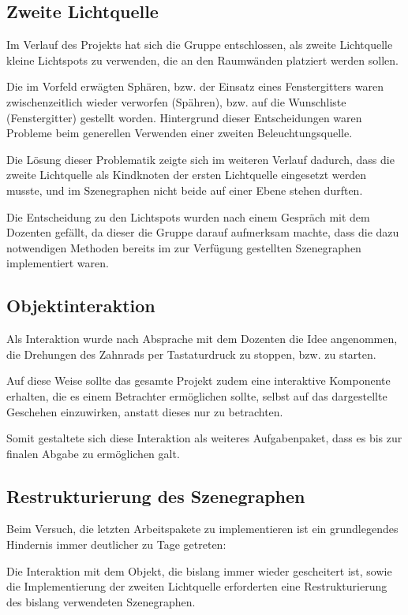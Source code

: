 \documentclass{article}
\begin{document}
\subsection{Zweite Lichtquelle}
Im Verlauf des Projekts hat sich die Gruppe entschlossen, als zweite 
Lichtquelle kleine Lichtspots zu verwenden, die an den Raumwänden platziert werden sollen. 

Die im Vorfeld erwägten Sphären, bzw. der Einsatz eines Fenstergitters waren zwischenzeitlich wieder verworfen (Spähren), bzw. auf die Wunschliste (Fenstergitter) gestellt worden. 
Hintergrund dieser Entscheidungen waren Probleme beim generellen Verwenden einer zweiten Beleuchtungsquelle. 

Die Lösung dieser Problematik zeigte sich im weiteren Verlauf dadurch, dass die zweite Lichtquelle als Kindknoten der ersten Lichtquelle eingesetzt werden musste, und im Szenegraphen nicht beide auf einer Ebene stehen durften. 

Die Entscheidung zu den Lichtspots wurden nach einem Gespräch mit dem Dozenten gefällt, da dieser die Gruppe darauf aufmerksam machte, dass die dazu notwendigen Methoden bereits im zur Verfügung gestellten Szenegraphen implementiert waren. 



\subsection{Objektinteraktion}
Als Interaktion wurde nach Absprache mit dem Dozenten die Idee angenommen, die Drehungen des Zahnrads per Tastaturdruck zu stoppen, bzw. zu starten. 

Auf diese Weise sollte das gesamte Projekt zudem eine interaktive Komponente erhalten, die es einem Betrachter ermöglichen sollte, selbst auf das dargestellte Geschehen einzuwirken, anstatt dieses nur zu betrachten. 

Somit gestaltete sich diese Interaktion als weiteres Aufgabenpaket, dass es bis zur finalen Abgabe zu ermöglichen galt. 



\subsection{Restrukturierung des Szenegraphen}
Beim Versuch, die letzten Arbeitspakete zu implementieren ist ein grundlegendes Hindernis immer deutlicher zu Tage getreten: 

Die Interaktion mit dem Objekt, die bislang immer wieder gescheitert ist, sowie die Implementierung der zweiten Lichtquelle erforderten eine Restrukturierung des bislang verwendeten Szenegraphen. 
\end{document}
